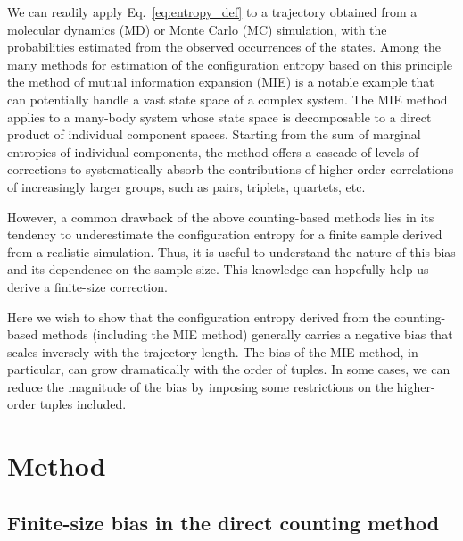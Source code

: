 \documentclass[preprint, superscriptaddress]{revtex4-1}
\begin{document}
We can readily apply Eq.~\eqref{eq:entropy_def} to a trajectory
obtained from a molecular dynamics (MD) or Monte Carlo (MC) simulation,
with the probabilities estimated from the observed occurrences of the states.
%
Among the many methods for estimation of the configuration entropy based on this principle
the method of mutual information expansion (MIE) is a notable example
that can potentially handle a vast state space of a complex system.
%
The MIE method applies to a many-body system
 whose state space is decomposable to a direct product of individual component spaces.
%
Starting from the sum of marginal entropies of individual components,
the method offers a cascade of levels of corrections
to systematically absorb the contributions of higher-order correlations
of increasingly larger groups, such as pairs, triplets, quartets, etc.

However, a common drawback of the above counting-based methods
lies in its tendency to underestimate the configuration entropy for a finite sample
derived from a realistic simulation.
%
Thus, it is useful to understand the nature of this bias
and its dependence on the sample size.
%
This knowledge can hopefully help us derive a finite-size correction.

Here we wish to show that the configuration entropy derived
from the counting-based methods (including the MIE method)
generally carries a negative bias that scales inversely with the trajectory length.
%
The bias of the MIE method, in particular,
can grow dramatically with the order of tuples.
%
In some cases, we can reduce the magnitude of the bias
by imposing some restrictions on the higher-order tuples included.

\section{Method}

\subsection{Finite-size bias in the direct counting method}
\end{document}
